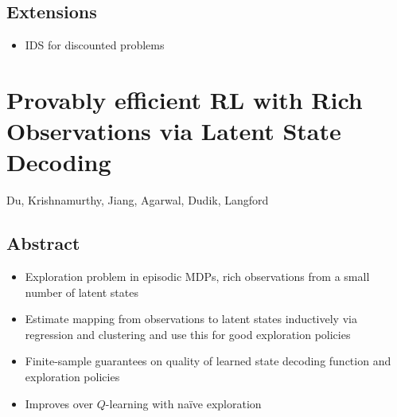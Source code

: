 \documentclass[11pt, openany]{book}
\begin{document}
\section{Extensions}
\begin{itemize}
    \item IDS for discounted problems
\end{itemize}

\chapter*{Provably efficient RL with Rich Observations via Latent State Decoding}
Du, Krishnamurthy, Jiang, Agarwal, Dudik, Langford \cite{ProvablyEfficientRLWithRichObservations}

\section{Abstract}
\begin{itemize}
    \item Exploration problem in episodic MDPs, rich observations from a small number of latent states
    \item Estimate mapping from observations to latent states inductively via regression and clustering and use this for good exploration policies
    \item Finite-sample guarantees on quality of learned state decoding function and exploration policies
    \item Improves over $Q$-learning with na\"{i}ve exploration
\end{itemize}
\end{document}
